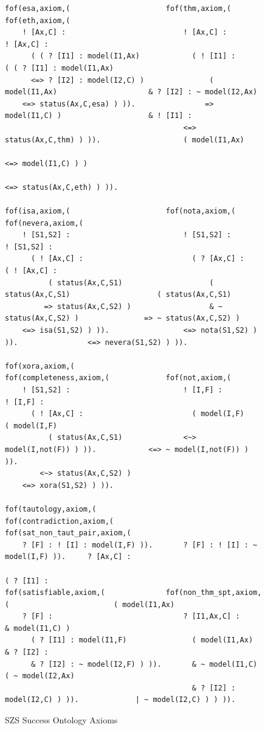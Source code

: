 \documentclass[a4paper]{easychair}
\begin{document}
\begin{figure}[htb]
  \begin{centering}
\begin{scriptsize}
\begin{verbatim}
fof(esa,axiom,(                      fof(thm,axiom,(                      fof(eth,axiom,(
    ! [Ax,C] :                           ! [Ax,C] :                           ! [Ax,C] :
      ( ( ? [I1] : model(I1,Ax)            ( ! [I1] :                           ( ( ? [I1] : model(I1,Ax)
      <=> ? [I2] : model(I2,C) )               ( model(I1,Ax)                     & ? [I2] : ~ model(I2,Ax)
    <=> status(Ax,C,esa) ) )).                => model(I1,C) )                    & ! [I1] :
                                         <=> status(Ax,C,thm) ) )).                   ( model(I1,Ax)
                                                                                      <=> model(I1,C) ) )
                                                                                <=> status(Ax,C,eth) ) )).

fof(isa,axiom,(                      fof(nota,axiom,(                     fof(nevera,axiom,(
    ! [S1,S2] :                          ! [S1,S2] :                          ! [S1,S2] :
      ( ! [Ax,C] :                         ( ? [Ax,C] :                         ( ! [Ax,C] :
          ( status(Ax,C,S1)                    ( status(Ax,C,S1)                    ( status(Ax,C,S1)
         => status(Ax,C,S2) )                  & ~ status(Ax,C,S2) )               => ~ status(Ax,C,S2) )
    <=> isa(S1,S2) ) )).                 <=> nota(S1,S2) ) )).                <=> nevera(S1,S2) ) )).

fof(xora,axiom,(                     fof(completeness,axiom,(             fof(not,axiom,(
    ! [S1,S2] :                          ! [I,F] :                            ! [I,F] :
      ( ! [Ax,C] :                         ( model(I,F)                         ( model(I,F)
          ( status(Ax,C,S1)              <~> model(I,not(F)) ) )).            <=> ~ model(I,not(F)) ) )).
        <~> status(Ax,C,S2) )
    <=> xora(S1,S2) ) )).

fof(tautology,axiom,(                fof(contradiction,axiom,(            fof(sat_non_taut_pair,axiom,(
    ? [F] : ! [I] : model(I,F) )).       ? [F] : ! [I] : ~ model(I,F) )).     ? [Ax,C] :
                                                                                ( ? [I1] :
fof(satisfiable,axiom,(              fof(non_thm_spt,axiom,(                        ( model(I1,Ax)
    ? [F] :                              ? [I1,Ax,C] :                              & model(I1,C) )
      ( ? [I1] : model(I1,F)               ( model(I1,Ax)                       & ? [I2] :
      & ? [I2] : ~ model(I2,F) ) )).       & ~ model(I1,C)                          ( ~ model(I2,Ax)
                                           & ? [I2] : model(I2,C) ) )).             | ~ model(I2,C) ) ) )).
\end{verbatim}
\end{scriptsize}
  \caption{SZS Success Ontology Axioms}
  \label{Axioms}
  \end{centering}
\end{figure}
\end{document}
